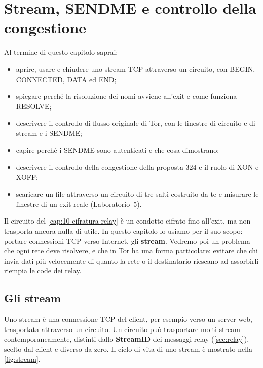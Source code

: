 \chapter{Stream, SENDME e controllo della congestione}\label{cap:11-stream}

\begin{obiettivi}
Al termine di questo capitolo saprai:
\begin{itemize}[nosep]
  \item aprire, usare e chiudere uno stream TCP attraverso un circuito, con BEGIN, CONNECTED, DATA ed END;
  \item spiegare perché la risoluzione dei nomi avviene all'exit e come funziona RESOLVE;
  \item descrivere il controllo di flusso originale di Tor, con le finestre di circuito e di stream e i SENDME;
  \item capire perché i SENDME sono autenticati e che cosa dimostrano;
  \item descrivere il controllo della congestione della proposta 324 e il ruolo di XON e XOFF;
  \item scaricare un file attraverso un circuito di tre salti costruito da te e misurare le finestre di un exit reale (Laboratorio~5).
\end{itemize}
\end{obiettivi}

Il circuito del \cref{cap:10-cifratura-relay} è un condotto cifrato fino all'exit, ma non trasporta ancora nulla di utile. In questo capitolo lo usiamo per il suo scopo: portare connessioni TCP verso Internet, gli \textbf{stream}. Vedremo poi un problema che ogni rete deve risolvere, e che in Tor ha una forma particolare: evitare che chi invia dati più velocemente di quanto la rete o il destinatario riescano ad assorbirli riempia le code dei relay.

\section{Gli stream}\label{sec:stream}

Uno stream è una connessione TCP del client, per esempio verso un server web, trasportata attraverso un circuito. Un circuito può trasportare molti stream contemporaneamente, distinti dallo \textbf{StreamID} dei messaggi relay (\cref{sec:relay}), scelto dal client e diverso da zero. Il ciclo di vita di uno stream è mostrato nella \cref{fig:stream}.

